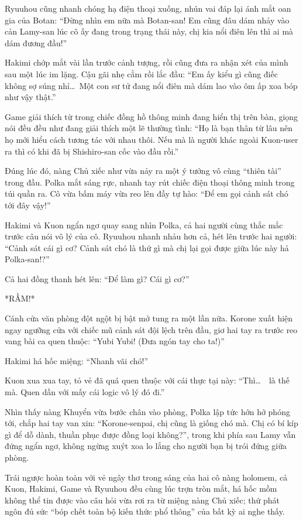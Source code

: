 \documentclass[../main.tex]{subfiles}
\begin{document}
Ryuuhou cũng nhanh chóng hạ điện thoại xuống, nhún vai đáp lại ánh mắt oan gia của Botan: ``Đừng nhìn em nữa mà Botan-san! Em cũng đâu dám nhảy vào cản Lamy-san lúc cô ấy đang trong trạng thái này, chị kia nổi điên lên thì ai mà dám đương đầu!''

Hakimi chớp mắt vài lần trước cảnh tượng, rồi cũng đưa ra nhận xét của mình sau một lúc im lặng. Cậu gãi nhẹ cằm rồi lắc đầu: ``Em ấy kiểu gì cũng điếc không sợ súng nhỉ\dots\ Một con sư tử đang nổi điên mà dám lao vào ôm ấp xoa bóp như vậy thật.''

Game giải thích từ trong chiếc đồng hồ thông minh đang hiển thị trên bàn, giọng nói đều đều như đang giải thích một lẽ thường tình: ``Họ là bạn thân từ lâu nên họ mới hiểu cách tương tác với nhau thôi. Nếu mà là người khác ngoài Kuon-user ra thì có khi đã bị Shishiro-san cốc vào đầu rồi.''

Đúng lúc đó, nàng Chủ xiếc như vừa nảy ra một ý tưởng vô cùng ``thiên tài'' trong đầu. Polka mắt sáng rực, nhanh tay rút chiếc điện thoại thông minh trong túi quần ra. Cô vừa bấm máy vừa reo lên đầy tự hào: ``Để em gọi cảnh sát chó tới đây vậy!''

Hakimi và Kuon ngẩn ngơ quay sang nhìn Polka, cả hai người cùng thắc mắc trước câu nói vô lý của cô. Ryuuhou nhanh nhảu hơn cả, hét lên trước hai người: ``Cảnh sát cái gì cơ? Cảnh sát chó là thứ gì mà chị lại gọi được giữa lúc này hả Polka-san!?''

Cả hai đồng thanh hét lên: ``Để làm gì? Cái gì cơ?''

*RẦM!*

Cánh cửa văn phòng đột ngột bị bật mở tung ra một lần nữa. Korone xuất hiện ngay ngưỡng cửa với chiếc mũ cảnh sát đội lệch trên đầu, giơ hai tay ra trước reo vang bài ca quen thuộc: ``Yubi Yubi! (Đưa ngón tay cho ta!)''


Hakimi há hốc miệng: ``Nhanh vãi chó!''

Kuon xua xua tay, tỏ vẻ đã quá quen thuộc với cái thực tại này: ``Thì\dots\ \hll\ là thế mà. Quen dần với mấy cái logic vô lý đó đi.''

Nhìn thấy nàng Khuyển vừa bước chân vào phòng, Polka lập tức hớn hở phóng tới, chắp hai tay van xin: ``Korone-senpai, chị cũng là giống chó mà. Chị có bí kíp gì để dỗ dành, thuần phục được đồng loại không?'', trong khi phía sau Lamy vẫn đứng ngẩn ngơ, không ngừng xuýt xoa lo lắng cho người bạn bị trói đứng giữa phòng.

Trái ngược hoàn toàn với vẻ ngây thơ trong sáng của hai cô nàng holomem, cả Kuon, Hakimi, Game và Ryuuhou đều cùng lúc trợn tròn mắt, há hốc mồm không thể tin được vào câu hỏi vừa rơi ra từ miệng nàng Chủ xiếc; thứ phát ngôn đủ sức ``bóp chết toàn bộ kiến thức phổ thông'' của bất kỳ ai nghe thấy.
\end{document}
